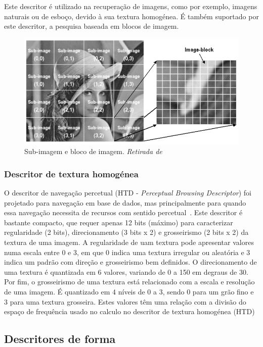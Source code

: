 Este descritor é utilizado na recuperação de imagens, como por exemplo, imagens naturais ou de esboço, devido à sua textura homogénea. É também suportado por este descritor, a pesquisa baseada em blocos de imagem.  

\begin{figure}
\centering
\includegraphics[width=0.7\linewidth]{./figures/ehd}
\caption{Sub-imagem e bloco de imagem. \textit{Retirada de}~\cite{Wu2001}}
\label{fig:ehd}
\end{figure}

\subsubsection{Descritor de textura homogénea}

O descritor de navegação percetual (HTD - \textit{Perceptual Browsing Descriptor}) foi projetado para navegação em base de dados, mas principalmente para quando essa navegação necessita de recursos com sentido percetual~\cite{Wu2001}. Este descritor é bastante compacto, que requer apenas 12 bits (máximo) para caracterizar regularidade (2 bits), direcionamento (3 bits x 2) e grosseirismo (2 bits x 2) da textura de uma imagem. A regularidade de uam textura pode apresentar valores numa escala entre 0 e 3, em que 0 indica uma textura irregular ou aleatória e 3 indica um padrão com direção e grosseirismo bem definidos. O direcionamento de uma textura é quantizada em 6 valores, variando de 0 a 150 em degraus de 30. Por fim, o grosseirismo de uma textura está relacionado com a escala e resolução de uma imagem. É quantizado em 4 níveis de 0 a 3, sendo 0 para um grão fino e 3 para uma textura grosseira. Estes valores têm uma relação com a divisão do espaço de frequência usado no calculo no descritor de textura homogénea (HTD)~\cite{Manjunath2001}

\subsection{Descritores de forma}

